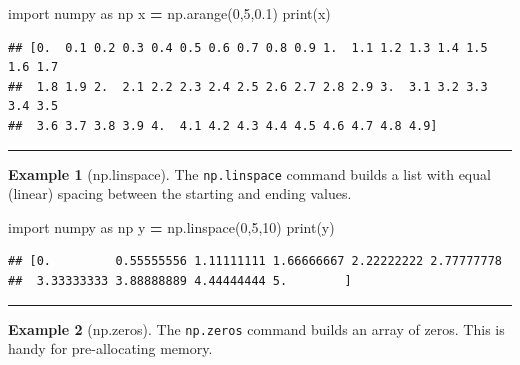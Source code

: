 \documentclass[
]{book}
\newenvironment{Shaded}{\begin{snugshade}}{\end{snugshade}}
\newcommand{\BuiltInTok}[1]{#1}
\newcommand{\DecValTok}[1]{\textcolor[rgb]{0.00,0.00,0.81}{#1}}
\newcommand{\FloatTok}[1]{\textcolor[rgb]{0.00,0.00,0.81}{#1}}
\newcommand{\ImportTok}[1]{#1}
\newcommand{\NormalTok}[1]{#1}
\newcommand{\OperatorTok}[1]{\textcolor[rgb]{0.81,0.36,0.00}{\textbf{#1}}}
\theoremstyle{definition}
\theoremstyle{definition}
\newtheorem{example}{Example}[chapter]
\theoremstyle{definition}
\theoremstyle{remark}
\begin{document}
\begin{Shaded}
\begin{Highlighting}[]
\ImportTok{import}\NormalTok{ numpy }\ImportTok{as}\NormalTok{ np}
\NormalTok{x }\OperatorTok{=}\NormalTok{ np.arange(}\DecValTok{0}\NormalTok{,}\DecValTok{5}\NormalTok{,}\FloatTok{0.1}\NormalTok{)}
\BuiltInTok{print}\NormalTok{(x)}
\end{Highlighting}
\end{Shaded}

\begin{verbatim}
## [0.  0.1 0.2 0.3 0.4 0.5 0.6 0.7 0.8 0.9 1.  1.1 1.2 1.3 1.4 1.5 1.6 1.7
##  1.8 1.9 2.  2.1 2.2 2.3 2.4 2.5 2.6 2.7 2.8 2.9 3.  3.1 3.2 3.3 3.4 3.5
##  3.6 3.7 3.8 3.9 4.  4.1 4.2 4.3 4.4 4.5 4.6 4.7 4.8 4.9]
\end{verbatim}

\begin{center}\rule{0.5\linewidth}{0.5pt}\end{center}

\begin{example}[np.linspace]
\protect\hypertarget{exm:unnamed-chunk-740}{}{\label{exm:unnamed-chunk-740} {} }The \texttt{np.linspace} command builds a list with equal (linear) spacing between the starting and ending values.
\end{example}

\begin{Shaded}
\begin{Highlighting}[]
\ImportTok{import}\NormalTok{ numpy }\ImportTok{as}\NormalTok{ np}
\NormalTok{y }\OperatorTok{=}\NormalTok{ np.linspace(}\DecValTok{0}\NormalTok{,}\DecValTok{5}\NormalTok{,}\DecValTok{10}\NormalTok{)}
\BuiltInTok{print}\NormalTok{(y)}
\end{Highlighting}
\end{Shaded}

\begin{verbatim}
## [0.         0.55555556 1.11111111 1.66666667 2.22222222 2.77777778
##  3.33333333 3.88888889 4.44444444 5.        ]
\end{verbatim}

\begin{center}\rule{0.5\linewidth}{0.5pt}\end{center}

\begin{example}[np.zeros]
\protect\hypertarget{exm:unnamed-chunk-742}{}{\label{exm:unnamed-chunk-742} {} }The \texttt{np.zeros} command builds an array of zeros. This is handy for pre-allocating memory.
\end{example}
\end{document}
